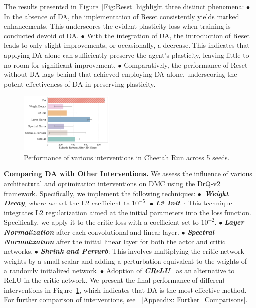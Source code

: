 \vspace{-0.5\baselineskip}
The results presented in Figure~\ref{Fig:Reset} highlight three distinct phenomena:
\textcolor{mydarkgreen}{$\bullet$} In the absence of DA, the implementation of Reset consistently yields marked enhancements. This underscores the evident plasticity loss when training is conducted devoid of DA.
\textcolor{mydarkgreen}{$\bullet$} With the integration of DA, the introduction of Reset leads to only slight improvements, or occasionally, a decrease. This indicates that applying DA alone can sufficiently preserve the agent's plasticity, leaving little to no room for significant improvement.
\textcolor{mydarkgreen}{$\bullet$} Comparatively, the performance of Reset without DA lags behind that achieved employing DA alone, underscoring the potent effectiveness of DA in preserving plasticity.

\begin{figure}
  \vspace{-1.2\baselineskip}  
  \includegraphics[width=0.41\textwidth]{Figures/1Data/reg_CR.pdf}
  \vspace{-2.1\baselineskip}
  \caption{Performance of various interventions in Cheetah Run across 5 seeds.}
  \label{fig:reg}
\end{figure}
\textbf{Comparing DA with Other Interventions.}
We assess the influence of various architectural and optimization interventions on DMC using the DrQ-v2 framework. Specifically, we implement the following techniques: 
\textcolor{mydarkgreen}{$\bullet$}~\textit{\textbf{Weight Decay}}, where we set the L2 coefficient to $10^{-5}$.
\textcolor{mydarkgreen}{$\bullet$} \textit{\textbf{L2 Init}}~\citep{Regenerative_Regularization}: This technique integrates L2 regularization aimed at the initial parameters into the loss function. Specifically, we apply it to the critic loss with a coefficient set to $10^{-2}$.
\textcolor{mydarkgreen}{$\bullet$} \textbf{\textit{Layer Normalization}}\citep{layer_norm} after each convolutional and linear layer.
\textcolor{mydarkgreen}{$\bullet$} \textbf{\textit{Spectral Normalization}}\citep{miyato2018spectral} after the initial linear layer for both the actor and critic networks.
\textcolor{mydarkgreen}{$\bullet$} \textbf{\textit{Shrink and Perturb}}\citep{shrink_and_perturb}: This involves multiplying the critic network weights by a small scalar and adding a perturbation equivalent to the weights of a randomly initialized network.
\textcolor{mydarkgreen}{$\bullet$} Adoption of \textbf{\textit{CReLU}}~\citep{shang2016understanding} as an alternative to ReLU in the critic network.
We present the final performance of different interventions in Figure~\ref{fig:reg}, which indicates that DA is the most effective method.
For further comparison of interventions, see \Appendix~\ref{Appendix: Further_Comparisons}.

